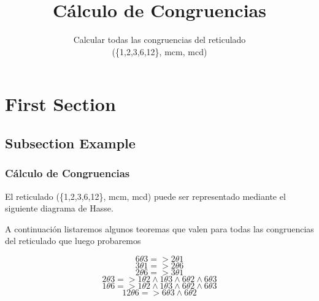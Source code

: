 \documentclass{beamer}
\title[Short title]{C\'alculo de Congruencias} %
\author{Calcular todas las congruencias del reticulado\\ (\{1,2,3,6,12\}, mcm, mcd)}
\begin{document}
\begin{frame}
\titlepage %
\end{frame}



\section{First Section}

\subsection{Subsection Example}

\begin{frame}
\frametitle{C\'alculo de Congruencias}
El reticulado (\{1,2,3,6,12\}, mcm, mcd) puede ser representado mediante el siguiente diagrama de Hasse.\\

\begin{center}
\end{center}
\end{frame}

\begin{frame}
A continuaci\'on listaremos algunos teoremas que valen para todas las congruencias del reticulado que luego probaremos
\begin{theorem}

\[  6 \theta 3 =>  2 \theta 1 \]
\[  3 \theta 1 =>  2 \theta 6 \]
\[  2 \theta 6 =>  3 \theta 1 \]
\[  2 \theta 3 =>  1 \theta 2 \land 1\theta3 \land 6\theta2 \land 6\theta3 \]
\[  1 \theta 6 =>  1 \theta 2 \land 1\theta3 \land 6\theta2 \land 6\theta3 \]
\[  12 \theta 6 =>  6 \theta 3 \land  6\theta2 \]

\end{theorem}
\end{frame}
\end{document}
